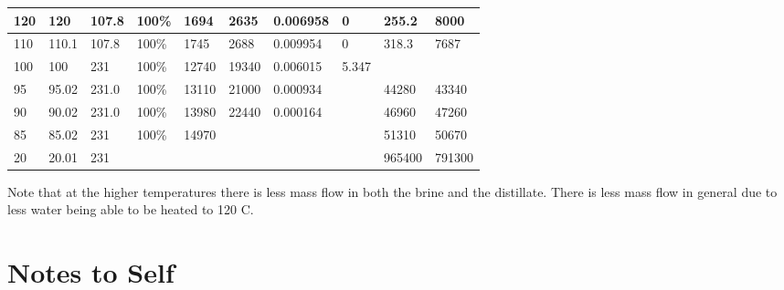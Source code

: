 \documentclass[12pt]{UIdahoMastersThesis}
\begin{document}
\begin{landscape}
\begin{table}[h!]
\begin{tabular}{|l|l|l|l|l|l|l|l|l|l|}
120  & 120  &  107.8 &   100\% & 1694 & 2635  & 0.006958 & 0 & 255.2 &  8000 \\ \hline
110 & 110.1 & 107.8 & 100\% & 1745 & 2688 & 0.009954 & 0 & 318.3 & 7687\\ \hline
100 & 100 & 231 & 100\% & 12740 & 19340 & 0.006015 & 5.347 & &  \\ \hline
95  & 95.02  & 231.0 & 100\%  & 13110 & 21000 & 0.000934 & & 44280 & 43340\\ \hline
90 & 90.02 & 231.0 & 100\% & 13980 & 22440 & 0.000164 &  & 46960 & 47260\\ \hline
85 & 85.02 & 231 & 100\% & 14970                                                                                      &                                                                                       &                                                                     &                                                                & 51310                                                                        & 50670                                                                          \\ \hline
20                                                                                                                  & 20.01                                                                                                                         & 231                                                                                     &                                                                                                             &                                                                                            &                                                                                       &                                                                     &                                                                & 965400                                                                   & 791300                                                                         \\ \hline
\end{tabular}
\end{table}
\end{landscape}

Note that at the higher temperatures there is less mass flow in both the brine and the distillate.  There is less mass flow in general due to less water being able to be heated to 120 \degree C.

\section{Notes to Self}
\end{document}
